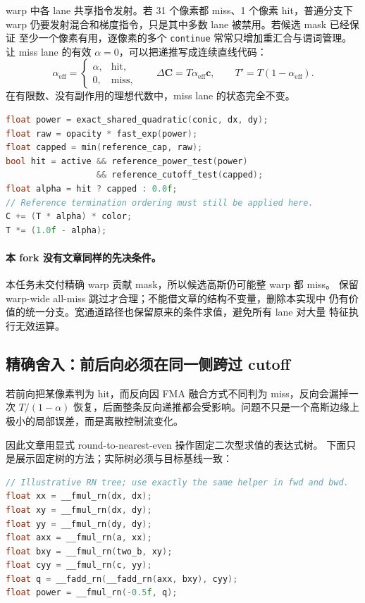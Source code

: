 warp 中各 lane 共享指令发射。若 31 个像素都 miss、1 个像素 hit，普通分支下
warp 仍要发射混合和梯度指令，只是其中多数 lane 被禁用。若候选 mask 已经保证
至少一个像素有用，逐像素的多个 \texttt{continue} 常常只增加重汇合与谓词管理。
让 miss lane 的有效 $\alpha=0$，可以把递推写成连续直线代码：
\begin{equation}
 \alpha_{\mathrm{eff}}=
 \begin{cases}\alpha,&\text{hit},\\0,&\text{miss},\end{cases}
 \qquad
 \Delta\boldsymbol C=T\alpha_{\mathrm{eff}}\boldsymbol c,
 \qquad T'=T(1-\alpha_{\mathrm{eff}}).
\end{equation}
在有限数、没有副作用的理想代数中，miss lane 的状态完全不变。

\begin{lstlisting}[language=C++,basicstyle=\ttfamily\small,breaklines=true]
float power = exact_shared_quadratic(conic, dx, dy);
float raw = opacity * fast_exp(power);
float capped = min(reference_cap, raw);
bool hit = active && reference_power_test(power)
                  && reference_cutoff_test(capped);
float alpha = hit ? capped : 0.0f;
// Reference termination ordering must still be applied here.
C += (T * alpha) * color;
T *= (1.0f - alpha);
\end{lstlisting}

\paragraph{本 fork 没有文章同样的先决条件。}
本任务未交付精确 warp 贡献 mask，所以候选高斯仍可能整 warp 都 miss。
保留 warp-wide all-miss 跳过才合理；不能借文章的结构不变量，删除本实现中
仍有价值的统一分支。宽通道路径也保留原来的条件求值，避免所有 lane 对大量
特征执行无效运算。

\subsection{精确舍入：前后向必须在同一侧跨过 cutoff}

若前向把某像素判为 hit，而反向因 FMA 融合方式不同判为 miss，反向会漏掉一次
$T/(1-\alpha)$ 恢复，后面整条反向递推都会受影响。问题不只是一个高斯边缘上
极小的局部误差，而是离散控制流变化。

因此文章用显式 round-to-nearest-even 操作固定二次型求值的表达式树。
下面只是展示固定树的方法；实际树必须与目标基线一致：

\begin{lstlisting}[language=C++,basicstyle=\ttfamily\small,breaklines=true]
// Illustrative RN tree; use exactly the same helper in fwd and bwd.
float xx = __fmul_rn(dx, dx);
float xy = __fmul_rn(dx, dy);
float yy = __fmul_rn(dy, dy);
float axx = __fmul_rn(a, xx);
float bxy = __fmul_rn(two_b, xy);
float cyy = __fmul_rn(c, yy);
float q = __fadd_rn(__fadd_rn(axx, bxy), cyy);
float power = __fmul_rn(-0.5f, q);
\end{lstlisting}


